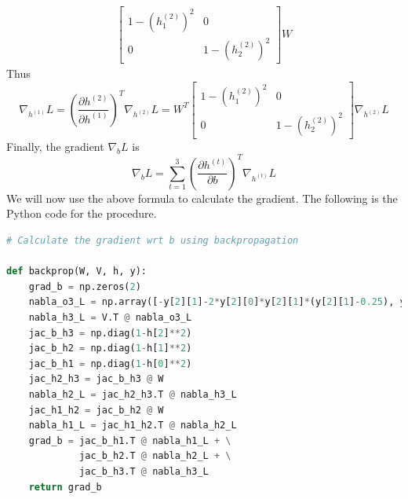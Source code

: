 \documentclass[
	12pt, %
]{../Template/fphw}
\begin{document}
\begin{enumerate}[label=(\arabic*)]
\begin{align}
\begin{bmatrix}
            1-(h^{(2)}_{1})^2 & 0 \\ 0 & 1-(h^{(2)}_{2})^2 
        \end{bmatrix}W
    \end{align}
    Thus
    \begin{equation}
        \nabla_{h^{(1)}}L = \left(\frac{\partial h^{(2)}}{\partial h^{(1)}}\right)^T \nabla_{h^{(2)}}L = W^T\begin{bmatrix}
            1-(h^{(2)}_{1})^2 & 0 \\ 0 & 1-(h^{(2)}_{2})^2 
        \end{bmatrix} \nabla_{h^{(2)}}L
    \end{equation}
    Finally, the gradient $\nabla_{b}L$ is 
    \begin{equation}
        \nabla_{b}L = \sum_{t=1}^{3} \left( \frac{\partial h^{(t)}}{\partial b}\right)^T \nabla_{h^{(t)}} L
    \end{equation}
    We will now use the above formula to calculate the gradient. The following is the Python code for the procedure.
    \begin{lstlisting}[language=Python]
# Calculate the gradient wrt b using backpropagation

def backprop(W, V, h, y):
    grad_b = np.zeros(2)
    nabla_o3_L = np.array([-y[2][1]-2*y[2][0]*y[2][1]*(y[2][1]-0.25), y[2][1]+2*y[2][0]*y[2][1]*(y[2][1]-0.25)])
    nabla_h3_L = V.T @ nabla_o3_L
    jac_b_h3 = np.diag(1-h[2]**2)
    jac_b_h2 = np.diag(1-h[1]**2)
    jac_b_h1 = np.diag(1-h[0]**2)
    jac_h2_h3 = jac_b_h3 @ W
    nabla_h2_L = jac_h2_h3.T @ nabla_h3_L
    jac_h1_h2 = jac_b_h2 @ W
    nabla_h1_L = jac_h1_h2.T @ nabla_h2_L
    grad_b = jac_b_h1.T @ nabla_h1_L + \
             jac_b_h2.T @ nabla_h2_L + \
             jac_b_h3.T @ nabla_h3_L
    return grad_b


\end{lstlisting}
\end{enumerate}
\end{document}
